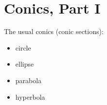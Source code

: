 \documentclass{amsbook}
\newcommand{\ssp}{\begin{enumerate}[(a), leftmargin=*]}
\newcommand{\esp}{\end{enumerate}}
\newtheorem{exc}{}
\newenvironment{ex}{\begin{exc}\normalfont}{\end{exc}}
\numberwithin{section}{chapter}
\numberwithin{equation}{chapter}
\newcommand{\drawgridxxyyb}[4]{
	\draw[thick,->] (#1,0) -- (#2,0) node[right] {$x$}; 
	\draw[thick, ->] (0,#3) -- (0,#4) node[above] {$y$};
}
\begin{document}
\begin{comment} %

\begin{ex}
	Below is a graph of the function $f(x)=\cosh(x)$. This function is called the hyperbolic cosine and one application is the modeling the shape of a suspended cable or chain, hanging under its own weight.
	
	\begin{tikzpicture}
		\drawgridxxyyb{-2.1}{2.1}{-0.3}{4}
		\draw[<->, thick, samples=10, domain=-2:2, smooth] plot (\x, {(exp(\x)+exp(-\x))/2}) node [above] {\small $f(x)=\cosh(x)$};
		\draw[fill] (0,1) circle [radius=0.07] node [below right] {\small $(0,1)$};
		\draw[fill] (.693147,1.25) circle [radius=0.07] node [below right] {\small $\ \ \left(\ln(2),\dfrac{5}{4}\right)$};
		\draw[fill] (-.693147,1.25) circle [radius=0.07] node [below left] {\small $\left(-\ln(2),\dfrac{5}{4}\right)$};
	\end{tikzpicture}
	\begin{tikzpicture}[scale=1.25]
\drawgridxxyyb{-3}{3}{-0.1}{2}
\draw[<->, thick, samples=10, domain=-1:1, smooth] plot (3* \x, {(exp(\x)+exp(-\x))/2}) node [above] {\small $g(x)=$?};
\draw[dashed, <->, very thick] (2.0794,0) -- (2.0794,1.25);
\draw[dashed, <->, very thick] (-2.0794,0) -- (-2.0794,1.25);
\draw[dashed, <->, very thick] (-2.0794,-0.3) -- (2.0794,-0.3);
\draw (0,-0.3) node [below] {$w$};
\draw (2.0794,0.6) node [right] {$h$};
\draw (-2.0794,0.6) node [left] {$h$};
\end{tikzpicture}
\end{ex}
\ssp
\item If the graph of $g(x)$ in the diagram is a transformed version of the graph of $f(x)=\cosh(x)$, what is $g(x)$?
\esp
\end{comment}

\begin{multicols}{2}
	
\end{multicols}


\newpage
\section{Conics, Part I} \label{Parabolas}
The usual conics (conic sections):
\begin{itemize}
	\item circle
	\item ellipse
	\item parabola
	\item hyperbola
\end{itemize}
\end{document}
